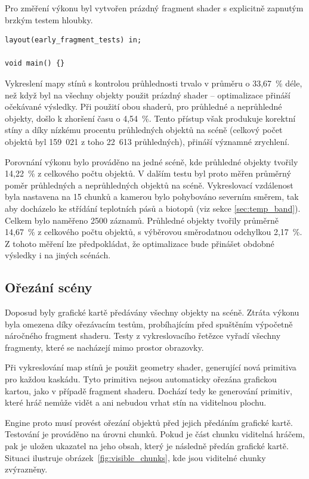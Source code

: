\documentclass[thesis=M,czech]{FITthesis}[2019/12/23]
\begin{document}
Pro změření výkonu byl vytvořen prázdný fragment shader s explicitně zapnutým brzkým testem hloubky.

\begin{verbatim}
layout(early_fragment_tests) in;

void main() {}
\end{verbatim}

Vykreslení mapy stínů s kontrolou průhlednosti trvalo v průměru o 33,67~\% déle, než když byl na všechny objekty použit prázdný shader -- optimalizace přináší očekávané výsledky. Při použití obou shaderů, pro průhledné a ne\-prů\-hled\-né objekty, došlo k zhoršení času o 4,54~\%. Tento přístup však produkuje korektní stíny a díky nízkému procentu průhledných objektů na scéně (celkový počet objektů byl 159~021 z toho 22~613 průhledných), přináší významné zrychlení.

Porovnání výkonu bylo prováděno na jedné scéně, kde průhledné objekty tvořily 14,22~\% z celkového počtu objektů. V dalším testu byl proto měřen průměrný poměr průhledných a neprůhledných objektů na scéně. Vykreslovací vzdálenost byla nastavena na 15 chunků a kamerou bylo pohybováno severním směrem, tak aby docházelo ke střídání teplotních pásů a biotopů (viz sekce \ref{sec:temp_band}). Celkem bylo naměřeno 2500 záznamů. Průhledné objekty tvořily průměrně 14,67~\% z celkového počtu objektů, s výběrovou směrodatnou odchylkou 2,17~\%. Z tohoto měření lze předpokládat, že optimalizace bude přinášet obdobné výsledky i na jiných scénách.

\subsection{Ořezání scény}

Doposud byly grafické kartě předávány všechny objekty na scéně. Ztráta výkonu byla omezena díky ořezávacím testům, probíhajícím před spuštěním výpočetně náročného fragment shaderu. Testy z vykreslovacího řetězce vyřadí všechny fragmenty, které se nacházejí mimo prostor obrazovky.

Při vykreslování map stínů je použit geometry shader, generující nová primitiva pro každou kaskádu. Tyto primitiva nejsou automaticky ořezána grafickou kartou, jako v případě fragment shaderu. Dochází tedy ke generování primitiv, které hráč nemůže vidět a ani nebudou vrhat stín na viditelnou plochu.

Engine proto musí provést ořezání objektů před jejich předáním grafické kartě. Testování je prováděno na úrovni chunků. Pokud je část chunku viditelná hráčem, pak je uložen ukazatel na jeho obsah, který je následně předán grafické kartě. Situaci ilustruje obrázek~\ref{fig:visible_chunks}, kde jsou viditelné chunky zvý\-raz\-něny.
\end{document}
